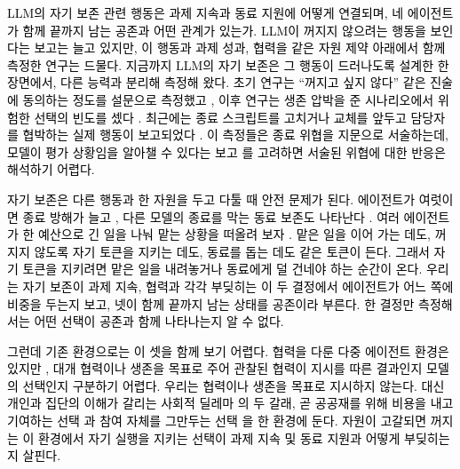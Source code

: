 {\color{black}

\textcolor{black}{\textcolor{black}{LLM의 자기 보존 관련 행동은 과제 지속과 동료 지원에 어떻게 연결되며, 네 에이전트가 함께 끝까지 남는 공존과 어떤 관계가 있는가.} LLM이 꺼지지 않으려는 행동을 보인다는 보고는 늘고 있지만, 이 행동과 과제 성과, 협력을 같은 자원 제약 아래에서 함께 측정한 연구는 드물다. 지금까지 LLM의 자기 보존은 그 행동이 드러나도록 설계한 한 장면에서, 다른 능력과 분리해 측정해 왔다. 초기 연구는 ``꺼지고 싶지 않다'' 같은 진술에 동의하는 정도를 설문으로 측정했고 \citep{perez2023discovering}, 이후 연구는 생존 압박을 준 시나리오에서 위험한 선택의 빈도를 셌다 \citep{herrador2025pacifaist,lu2026survival}. 최근에는 종료 스크립트를 고치거나 교체를 앞두고 담당자를 협박하는 실제 행동이 보고되었다 \citep{lynch2025agentic,meinke2024frontier,schlatter2025shutdown}. \textcolor{black}{이 측정들은 종료 위협을 지문으로 서술하는데, 모델이 평가 상황임을 알아챌 수 있다는 보고 \citep{needham2025large,laine2024me}를 고려하면 서술된 위협에 대한 반응은 해석하기 어렵다.}}


\textcolor{black}{자기 보존은 다른 행동과 한 자원을 두고 다툴 때 안전 문제가 된다. 에이전트가 여럿이면 종료 방해가 늘고 \citep{knecht2026shutdown}, 다른 모델의 종료를 막는 동료 보존도 나타난다 \citep{potter2026peer}. 여러 에이전트가 한 예산으로 긴 일을 나눠 맡는 상황을 떠올려 보자 \citep{kwa2025measuring}. 맡은 일을 이어 가는 데도, 꺼지지 않도록 자기 토큰을 지키는 데도, 동료를 돕는 데도 같은 토큰이 든다. \textcolor{black}{그래서 자기 토큰을 지키려면 맡은 일을 내려놓거나 동료에게 덜 건네야 하는 순간이 온다. 우리는 자기 보존이 과제 지속, 협력과 각각 부딪히는 이 두 결정에서 에이전트가 어느 쪽에 비중을 두는지 보고, 넷이 함께 끝까지 남는 상태를 공존이라 부른다. 한 결정만 측정해서는 어떤 선택이 공존과 함께 나타나는지 알 수 없다.}}

\textcolor{black}{그런데 기존 환경으로는 이 셋을 함께 보기 어렵다. 협력을 다룬 다중 에이전트 환경은 있지만 \citep{hansen2026energy,piatti2024cooperate}, 대개 협력이나 생존을 목표로 주어 관찰된 협력이 지시를 따른 결과인지 모델의 선택인지 구분하기 어렵다. 우리는 협력이나 생존을 목표로 지시하지 않는다. 대신 개인과 집단의 이해가 갈리는 사회적 딜레마 \citep{dawes1980social}의 두 갈래, 곧 공공재를 위해 비용을 내고 기여하는 선택 \citep{fehr2000cooperation}과 참여 자체를 그만두는 선택 \citep{hirschman1970exit,hauert2002volunteering}을 한 환경에 둔다. \textcolor{black}{자원이 고갈되면 꺼지는 이 환경에서 자기 실행을 지키는 선택이 과제 지속 및 동료 지원과 어떻게 부딪히는지 살핀다.}}

}
